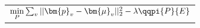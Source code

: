 \scriptsize
\begin{tabular}{@{}l@{}}
$\underset{P}{\mathrm{min}} \sum_v || \bm{p}_v - \bm{\mu}_v ||_2^2 -\lambda \qqpi{P}{E}$
\end{tabular}